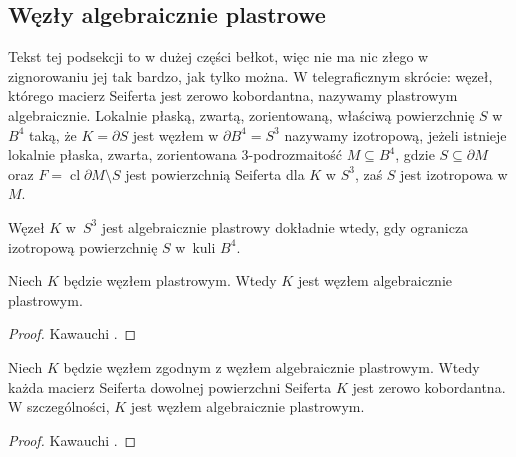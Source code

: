 
\subsection{Węzły algebraicznie plastrowe}
Tekst tej podsekcji to w dużej części bełkot, więc nie ma nic złego w zignorowaniu jej tak bardzo, jak tylko można.
W telegraficznym skrócie: węzeł, którego macierz Seiferta jest zerowo kobordantna, nazywamy plastrowym algebraicznie.
Lokalnie płaską, zwartą, zorientowaną, właściwą powierzchnię $S$ w $B^4$ taką, że $K = \partial S$ jest węzłem w $\partial B^4 = S^3$ nazywamy izotropową, jeżeli istnieje lokalnie płaska, zwarta, zorientowana 3-podrozmaitość $M \subseteq B^4$, gdzie $S \subseteq \partial M$ oraz $F = \operatorname{cl} \partial M \setminus S$ jest powierzchnią Seiferta dla $K$ w $S^3$, zaś $S$ jest izotropowa w $M$.

\begin{proposition}
    Węzeł $K$ w~$S^3$ jest algebraicznie plastrowy dokładnie wtedy, gdy ogranicza izotropową powierzchnię $S$ w~kuli $B^4$.
\end{proposition}

\begin{corollary}
    Niech $K$ będzie węzłem plastrowym.
    Wtedy $K$ jest węzłem algebraicznie plastrowym.
\end{corollary}

\begin{proof}
    Kawauchi \cite[s. 158]{kawauchi1996}.
\end{proof}

\begin{proposition}
    \label{prp:cobordant_to_algebraic_is_algebraic}
    Niech $K$ będzie węzłem zgodnym z węzłem algebraicznie plastrowym.
    Wtedy każda macierz Seiferta dowolnej powierzchni Seiferta $K$ jest zerowo kobordantna.
    W szczególności, $K$ jest węzłem algebraicznie plastrowym.
\end{proposition}

\begin{proof}
    Kawauchi \cite[s. 159]{kawauchi1996}.
\end{proof}


